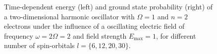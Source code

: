 \begin{figure}[!h]
    \centering
    \caption{Time-dependent energy (left) and ground state probability (right)
        of a two-dimensional harmonic oscillator with $\Omega=1$
        and $n=2$ electrons under the influence of a oscillating electric field 
        of frequency $\omega = 2 \Omega = 2$ and field strength $E_\text{max}=1$,
        for different number of spin-orbitals $l=\{6,12,20,30\}$.
    }
    \label{fig:2d_n2_qd}
\end{figure}


